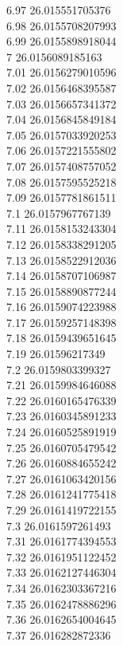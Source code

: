 {6.97	26.015551705376\\
6.98	26.0155708207993\\
6.99	26.0155898918044\\
7	26.0156089185163\\
7.01	26.0156279010596\\
7.02	26.0156468395587\\
7.03	26.0156657341372\\
7.04	26.0156845849184\\
7.05	26.0157033920253\\
7.06	26.0157221555802\\
7.07	26.0157408757052\\
7.08	26.0157595525218\\
7.09	26.0157781861511\\
7.1	26.0157967767139\\
7.11	26.0158153243304\\
7.12	26.0158338291205\\
7.13	26.0158522912036\\
7.14	26.0158707106987\\
7.15	26.0158890877244\\
7.16	26.0159074223988\\
7.17	26.0159257148398\\
7.18	26.0159439651645\\
7.19	26.01596217349\\
7.2	26.0159803399327\\
7.21	26.0159984646088\\
7.22	26.0160165476339\\
7.23	26.0160345891233\\
7.24	26.0160525891919\\
7.25	26.0160705479542\\
7.26	26.0160884655242\\
7.27	26.0161063420156\\
7.28	26.0161241775418\\
7.29	26.0161419722155\\
7.3	26.0161597261493\\
7.31	26.0161774394553\\
7.32	26.0161951122452\\
7.33	26.0162127446304\\
7.34	26.0162303367216\\
7.35	26.0162478886296\\
7.36	26.0162654004645\\
7.37	26.016282872336\\
}
